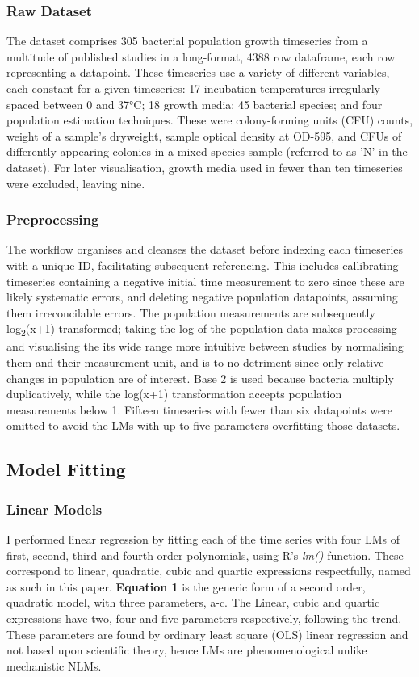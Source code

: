 \documentclass[11pt]{article}
\begin{document}
\subsubsection{Raw Dataset}
 The dataset comprises 305 bacterial population growth timeseries from a multitude of published studies in a long-format, 4388 row dataframe, each row representing a datapoint. These timeseries use a variety of different variables, each constant for a given timeseries: 17 incubation temperatures irregularly spaced between 0 and 37°C; 18 growth media; 45 bacterial species; and four population estimation techniques. These were colony-forming units (CFU) counts, weight of a sample's dryweight, sample optical density at OD-595, and CFUs of differently appearing colonies in a mixed-species sample (referred to as 'N' in the dataset).\parencite{Al-qadiri2008} For later visualisation, growth media used in fewer than ten timeseries were excluded, leaving nine.

\subsubsection{Preprocessing}
The workflow organises and cleanses the dataset before indexing each timeseries with a unique ID, facilitating subsequent referencing. This includes callibrating timeseries containing a negative initial time measurement to zero since these are likely systematic errors, and deleting negative population datapoints, assuming them irreconcilable errors.
The population measurements are subsequently log\textsubscript{2}(x+1) transformed; taking the log of the population data makes processing and visualising the its wide range more intuitive between studies by normalising them and their measurement unit, and is to no detriment since only relative changes in population are of interest. Base 2 is used because bacteria multiply duplicatively, while the log(x+1) transformation accepts population measurements below 1. Fifteen timeseries with fewer than six datapoints were omitted to avoid the LMs with up to five parameters overfitting those datasets.



\subsection{Model Fitting}

\subsubsection{Linear Models}
I performed linear regression by fitting each of the time series with four LMs of first, second, third and fourth order polynomials, using R's \textit{lm()} function. These correspond to linear, quadratic, cubic and quartic expressions respectfully, named as such in this paper. \textbf{Equation 1} is the generic form of a second order, quadratic model, with three parameters, a-c. The Linear, cubic and quartic expressions have two, four and five parameters respectively, following the trend. These parameters are found by ordinary least square (OLS) linear regression and not based upon scientific theory, hence LMs are phenomenological unlike mechanistic NLMs. 
\end{document}
